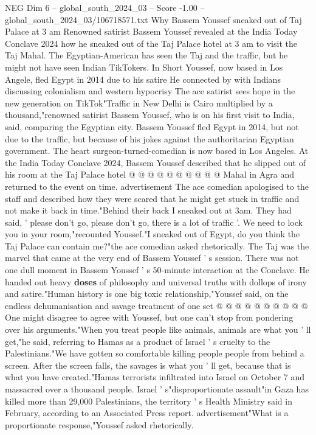 \begin{textsample}{NEG Dim 6 – global\_south\_2024\_03 – Score -1.00 – global\_south\_2024\_03/106718571.txt}  \label{ex:f6_neg_407}
Why Bassem Youssef sneaked out of Taj Palace at 3 am Renowned satirist Bassem Youssef revealed at the India Today Conclave 2024 how he sneaked out of the Taj Palace hotel at 3 am to visit the Taj Mahal.
The Egyptian-American has seen the Taj and the traffic, but he might not have seen Indian TikTokers.
In Short Youssef, now based in Los Angele, fled Egypt in 2014 due to his satire He connected by with Indians discussing colonialism and western hypocrisy The ace satirist sees hope in the new generation on TikTok"Traffic in New Delhi is Cairo multiplied by a thousand,"renowned satirist Bassem Youssef, who is on his first visit to India, said, comparing the Egyptian city.
Bassem Youssef fled Egypt in 2014, but not due to the traffic, but because of his jokes against the authoritarian Egyptian government.
The heart surgeon-turned-comedian is now based in Los Angeles.
At the India Today Conclave 2024, Bassem Youssef described that he slipped out of his room at the Taj Palace hotel @ @ @ @ @ @ @ @ @ @ Mahal in Agra and returned to the event on time. advertisement The ace comedian apologised to the staff and described how they were scared that he might get stuck in traffic and not make it back in time."Behind their back I sneaked out at 3am.
They had said, ' please don't go, please don't go, there is a lot of traffic '.
We need to lock you in your room,"recounted Youssef."I sneaked out of Egypt, do you think the Taj Palace can contain me?"the ace comedian asked rhetorically.
The Taj was the marvel that came at the very end of Bassem Youssef ' s session.
There was not one dull moment in Bassem Youssef ' s 50-minute interaction at the Conclave.
He handed out heavy \textbf{doses} of philosophy and universal truths with dollops of irony and satire."Human history is one big toxic relationship,"Youssef said, on the endless dehumanisation and savage treatment of one set @ @ @ @ @ @ @ @ @ @ One might disagree to agree with Youssef, but one can't stop from pondering over his arguments."When you treat people like animals, animals are what you ' ll get,"he said, referring to Hamas as a product of Israel ' s cruelty to the Palestinians."We have gotten so comfortable killing people people from behind a screen.
After the screen falls, the savages is what you ' ll get, because that is what you have created."Hamas terrorists infiltrated into Israel on October 7 and massacred over a thousand people.
Israel ' s"disproportionate assault"in Gaza has killed more than 29,000 Palestinians, the territory ' s Health Ministry said in February, according to an Associated Press report. advertisement"What is a proportionate response,"Youssef asked rhetorically.

\end{textsample}
